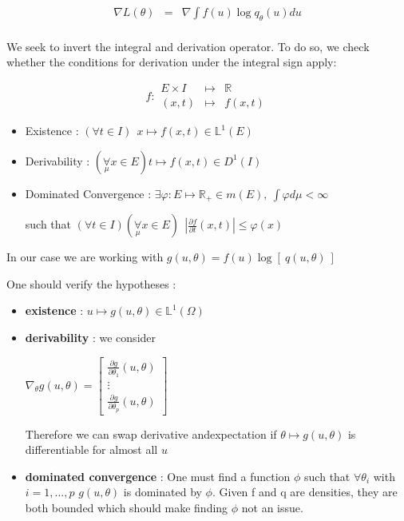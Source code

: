$$
\begin{array}{lcl}
\nabla L(\theta) &=& \nabla \displaystyle\int f(u) \log q_\theta(u) du
\\
\end{array}
$$

\bigskip

We seek to invert the integral and derivation operator. To do so, we check whether the conditions for derivation under the integral sign apply:


$$
f : \begin{array}{ccc}
E\times I&\mapsto& \mathbb R
\\
(x,t) &\mapsto& f(x,t)
\end{array}
$$





\begin{itemize}
    \item Existence :
        $(\forall t \in I) \ \ x \mapsto f(x,t) \in \mathbb L^1(E)$
    \item Derivability : 
        $(\underset{\mu}{\forall} x \in E) t \mapsto f(x,t) \in D^1(I)$
    \item Dominated Convergence : $\exists \varphi : E \mapsto \mathbb R_+ \in m(E), 
\ \int \varphi d\mu  < \infty$

such that $(\forall t \in I)(\underset \mu \forall x \in E) \ \ \left|\frac{\partial f}{\partial t}(x,t)\right| \leq \varphi(x)$
\end{itemize}

\bigskip


In our case we are working with $g(u, \theta) = f(u) \log\left[ \ q(u, \theta) \ \right]$

\bigskip

One should verify the hypotheses :

\bigskip

\begin{itemize}
    \item \textbf{existence} : $u \mapsto g(u, \theta) \in \mathds L^1(\Omega)$  

    \item \textbf{derivability} : we consider 
    
    $\nabla_\theta g(u, \theta) = \begin{bmatrix} \frac{\partial g}{\partial \theta_1}(u, \theta) \\ \vdots \\ \frac{\partial g}{\partial \theta_p}(u, \theta) \end{bmatrix}$

    \bigskip
    
    Therefore we can swap derivative andexpectation if $\theta \mapsto g(u,\theta)$ is differentiable for almost all $u$

    \item \textbf{dominated convergence} : One must find a function $\phi$ such that $\forall \theta_i$ with $i = 1, ..., p$ $g(u,\theta)$ is dominated by $\phi$. Given f and q are densities, they are both bounded which should make finding $\phi$ not an issue.
    
\end{itemize}

